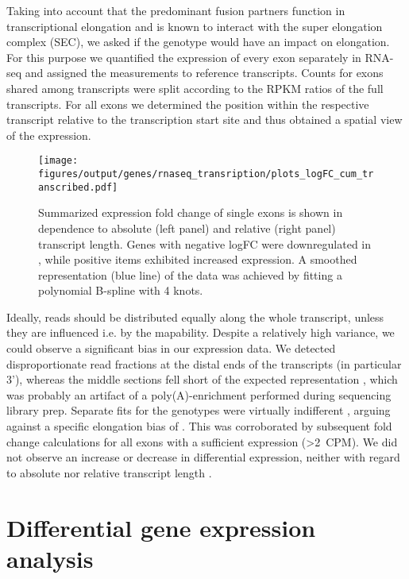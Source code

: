 Taking into account that the predominant  fusion partners function in transcriptional elongation\cite{Slany2009,Mohan2010,Lin2010} and \mllafnine is known to interact with the super elongation complex (SEC)\cite{Slany2016}, we asked if the \dnmtchip genotype would have an impact on elongation. For this purpose we quantified the expression of every exon separately in RNA-seq and assigned the measurements to reference transcripts. Counts for exons shared among transcripts were split according to the RPKM ratios of the full transcripts. For all exons we determined the position within the respective transcript relative to the transcription start site and thus obtained a spatial view of the expression. 

\begin{figure}[!ht]
	\centering
	\texttt{[image: figures/output/genes/rnaseq\_transription/plots\_logFC\_cum\_transcribed.pdf]} 
	\caption{Summarized expression fold change of single exons is shown in dependence to absolute (left panel) and relative (right panel) transcript length. Genes with negative logFC were downregulated in \dnmtchip, while positive items exhibited increased expression. A smoothed representation (blue line) of the data was achieved by fitting a polynomial B-spline with \num{4} knots.}
	\label{fig:plots_logFC_cum_transcribed}
\end{figure}

Ideally, reads should be distributed equally along the whole transcript, unless they are influenced i.e. by the mapability. Despite a relatively high variance, we could observe a significant bias in our expression data. We detected disproportionate read fractions at the distal ends of the transcripts (in particular 3'), whereas the middle sections fell short of the expected representation , which was probably an artifact of a poly(A)-enrichment performed during sequencing library prep. Separate fits for the genotypes were virtually indifferent \dns, arguing against a specific elongation bias of \dnmtchip. This was corroborated by subsequent fold change calculations for all exons with a sufficient expression (\textgreater \SI{2}{CPM}). We did not observe an increase or decrease in differential expression, neither with regard to absolute nor relative transcript length . 


\section{Differential gene expression analysis}
\label{chap:r:degenes:basics}\label{chap:r:degenes:changes}

